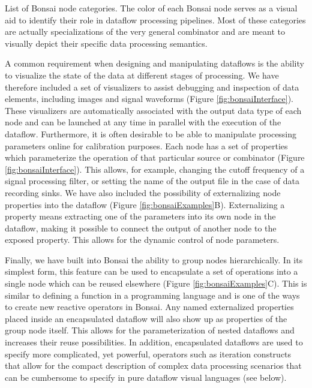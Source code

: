 \begin{table}
\begin{center}
\scalebox{0.7}{}
\end{center}
\vspace{-5mm}
\caption{List of Bonsai node categories. The color of each Bonsai node serves as a visual aid to identify their role in dataflow processing pipelines. Most of these categories are actually specializations of the very general combinator and are meant to visually depict their specific data processing semantics.}
\label{tab:bonsaiCategories}
\end{table}

A common requirement when designing and manipulating dataflows is the ability to visualize the state of the data at different stages of processing. We have therefore included a set of visualizers to assist debugging and inspection of data elements, including images and signal waveforms (Figure \ref{fig:bonsaiInterface}). These visualizers are automatically associated with the output data type of each node and can be launched at any time in parallel with the execution of the dataflow. Furthermore, it is often desirable to be able to manipulate processing parameters online for calibration purposes. Each node has a set of properties which parameterize the operation of that particular source or combinator (Figure \ref{fig:bonsaiInterface}). This allows, for example, changing the cutoff frequency of a signal processing filter, or setting the name of the output file in the case of data recording sinks. We have also included the possibility of externalizing node properties into the dataflow (Figure \ref{fig:bonsaiExamples}B). Externalizing a property means extracting one of the parameters into its own node in the dataflow, making it possible to connect the output of another node to the exposed property. This allows for the dynamic control of node parameters.

Finally, we have built into Bonsai the ability to group nodes hierarchically. In its simplest form, this feature can be used to encapsulate a set of operations into a single node which can be reused elsewhere (Figure \ref{fig:bonsaiExamples}C). This is similar to defining a function in a programming language and is one of the ways to create new reactive operators in Bonsai. Any named externalized properties placed inside an encapsulated dataflow will also show up as properties of the group node itself. This allows for the parameterization of nested dataflows and increases their reuse possibilities. In addition, encapsulated dataflows are used to specify more complicated, yet powerful, operators such as iteration constructs that allow for the compact description of complex data processing scenarios that can be cumbersome to specify in pure dataflow visual languages \cite{Mosconi2000} (see below).

